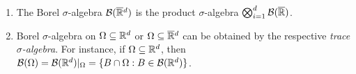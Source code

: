\begin{enumerate}
\begin{enumerate}
\item The Borel \(\sigma\)-algebra \(\mathcal{B}(\overline{\mathbb{R}}{}^d)\) is the
product \(\sigma\)-algebra \(\bigotimes_{i=1}^{d}\mathcal{B}(\overline{\mathbb{R}})\).

\item Borel \(\sigma\)-algebra on \(\Omega\subseteq \mathbb{R}^d\) or \(\Omega\subseteq
\overline{\mathbb{R}}{}^d\) can be obtained by the respective \emph{trace \(\sigma\)-algebra}.
For instance, if \(\Omega\subseteq \mathbb{R}^d\), then
\(\mathcal{B}(\Omega)=\mathcal{B}(\mathbb{R}^d)|_{\Omega}
=\{B\cap\Omega:B\in\mathcal{B}(\mathbb{R}^d)\}\).

\end{enumerate}
\end{enumerate}
